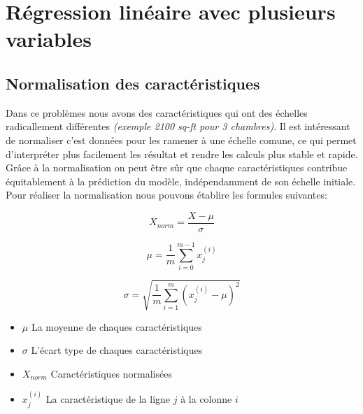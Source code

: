 \section{Régression linéaire avec plusieurs variables}
\subsection{Normalisation des caractéristiques}

Dans ce problèmes nous avons des caractéristiques qui ont des échelles radicallement différentes \textit{(exemple 2100 sq-ft pour 3 chambres)}. Il est intéressant de normaliser c'est données pour les ramener à une échelle comune, 
ce qui permet d'interpréter plus facilement les résultat et rendre les calculs plus stable et rapide. Grâce à la normalisation on peut être sûr que chaque caractéristiques contribue équitablement à la prédiction du modèle, indépendamment de son échelle initiale. \\

\noindent
Pour réaliser la normalisation nous pouvons établire les formules suivantes:

\begin{figure}[!h]
    \centering
    \begin{minipage}{.33\linewidth}
        \begin{equation*}
            X_{norm} = \frac{X - \mu}{\sigma}
        \end{equation*}
    \end{minipage}\hfill\vline
    \begin{minipage}{.33\linewidth}
        \begin{equation*}
            \mu = \frac{1}{m} \sum_{i=0}^{m-1}x_j^{(i)}
        \end{equation*}        
    \end{minipage}\hfill\vline
    \begin{minipage}{.33\linewidth}
        \begin{equation*}
            \sigma = \sqrt{\frac{1}{m} \sum_{i=1}^{m} \left(x_j^{(i)} - \mu\right)^2}
        \end{equation*}                
    \end{minipage}
\end{figure}

\begin{itemize}
    \item $\mu$ La moyenne de chaques caractéristiques
    \item $\sigma$ L'écart type de chaques caractéristiques
    \item $X_{norm}$ Caractéristiques normalisées
    \item $x_j^{(i)}$ La caractéristique de la ligne $j$ à la colonne $i$
\end{itemize}

